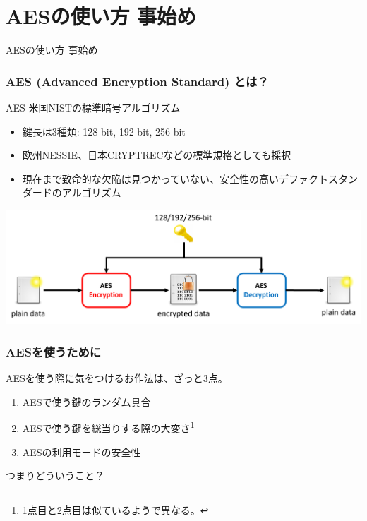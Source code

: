 \documentclass[12pt,dvipdfmx]{beamer}
\begin{document}
\section{AESの使い方 事始め}
\begin{frame}
\centering
{\Large AESの使い方 事始め}
\end{frame}

\begin{frame}
\frametitle{AES (Advanced Encryption Standard) とは？}
\begin{block}{AES}
米国NISTの標準暗号アルゴリズム\\
\begin{itemize}
 \item 鍵長は3種類: 128-bit, 192-bit, 256-bit
 \item 欧州NESSIE、日本CRYPTRECなどの標準規格としても採択
 \item 現在まで致命的な欠陥は見つかっていない、安全性の高い\alert{デファクトスタンダード}のアルゴリズム
\end{itemize}
\end{block}
\begin{center}
\includegraphics[width=0.9\linewidth]{Figs/aes_flow.pdf}
\end{center}
\end{frame}


\begin{frame}
\frametitle{AESを使うために}
AESを使う際に気をつけるお作法は、ざっと3点。
\begin{enumerate}
 \item AESで使う鍵の\alert{ランダム具合}
 \item AESで使う鍵を\alert{総当りする際の大変さ}\footnote[frame]{1点目と2点目は似ているようで異なる。}
 \item AESの\alert{利用モードの安全性}
\end{enumerate}

\vspace{2ex}
つまりどういうこと？

\end{frame}
\end{document}
